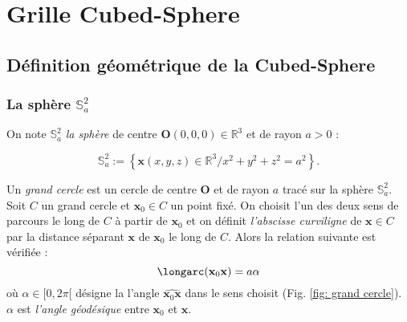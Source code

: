 \chapter{Grille Cubed-Sphere}

\section{Définition géométrique de la Cubed-Sphere}

\subsection{La sphère $\mathbb{S}_a^2$}

On note $\mathbb{S}_a^2$ \textit{la sphère} de centre $\mathbf{O} (0,0,0) \in \mathbb{R}^3$ et de rayon $a>0$ :

\begin{equation}
\mathbb{S}_a^2 := \left\lbrace
\mathbf{x} (x,y,z) \in \mathbb{R}^3 / x^2+y^2+z^2 = a^2
\right\rbrace.
\end{equation} 

Un \textit{grand cercle} est un cercle de centre $\mathbf{O}$ et de rayon $a$ tracé sur la sphère $\mathbb{S}_a^2$.
Soit $C$ un grand cercle et $\mathbf{x}_0 \in C$ un point fixé. On choisit l'un des deux sens de parcours le long de $C$ à partir de $\mathbf{x}_0$ et on définit \textit{l'abscisse curviligne} de $\mathbf{x} \in C$ par la distance séparant $\mathbf{x}$ de $\mathbf{x}_0$ le long de $C$. Alors la relation suivante est vérifiée :
\begin{equation}
\longarc(\mathbf{x}_0  \mathbf{x}) = a \alpha
\end{equation}
où $\alpha \in [ 0, 2 \pi[$ désigne la l'angle $\widehat{\mathbf{x}_0  \mathbf{x}}$ dans le sens choisit (Fig. \ref{fig: grand cercle}). $\alpha$ est \textit{l'angle géodésique} entre $\mathbf{x}_0$ et $\mathbf{x}$.

